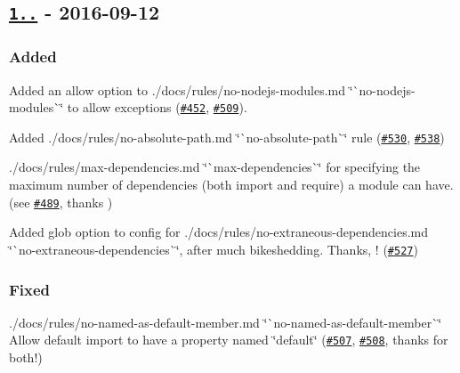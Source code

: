 \subsection*{\href{https://github.com/benmosher/eslint-plugin-import/compare/v1.14.0...v1.15.0}{\tt 1..} -\/ 2016-\/09-\/12}

\subsubsection*{Added}


\begin{DoxyItemize}
\item Added an {\ttfamily allow} option to ./docs/rules/no-\/nodejs-\/modules.md \char`\"{}\`{}no-\/nodejs-\/modules\`{}\char`\"{} to allow exceptions (\href{https://github.com/benmosher/eslint-plugin-import/issues/452}{\tt \#452}, \href{https://github.com/benmosher/eslint-plugin-import/pull/509}{\tt \#509}).
\item Added ./docs/rules/no-\/absolute-\/path.md \char`\"{}\`{}no-\/absolute-\/path\`{}\char`\"{} rule (\href{https://github.com/benmosher/eslint-plugin-import/issues/530}{\tt \#530}, \href{https://github.com/benmosher/eslint-plugin-import/pull/538}{\tt \#538})
\item ./docs/rules/max-\/dependencies.md \char`\"{}\`{}max-\/dependencies\`{}\char`\"{} for specifying the maximum number of dependencies (both {\ttfamily import} and {\ttfamily require}) a module can have. (see \href{https://github.com/benmosher/eslint-plugin-import/pull/489}{\tt \#489}, thanks \href{https://github.com/tizmagik}{\tt })
\item Added glob option to config for ./docs/rules/no-\/extraneous-\/dependencies.md \char`\"{}\`{}no-\/extraneous-\/dependencies\`{}\char`\"{}, after much bikeshedding. Thanks, \href{https://github.com/knpwrs}{\tt }! (\href{https://github.com/benmosher/eslint-plugin-import/pull/527}{\tt \#527})
\end{DoxyItemize}

\subsubsection*{Fixed}


\begin{DoxyItemize}
\item ./docs/rules/no-\/named-\/as-\/default-\/member.md \char`\"{}\`{}no-\/named-\/as-\/default-\/member\`{}\char`\"{} Allow default import to have a property named \char`\"{}default\char`\"{} (\href{https://github.com/benmosher/eslint-plugin-import/issues/507}{\tt \#507}, \href{https://github.com/benmosher/eslint-plugin-import/pull/508}{\tt \#508}, thanks \href{https://github.com/jquense}{\tt } for both!)
\end{DoxyItemize}

